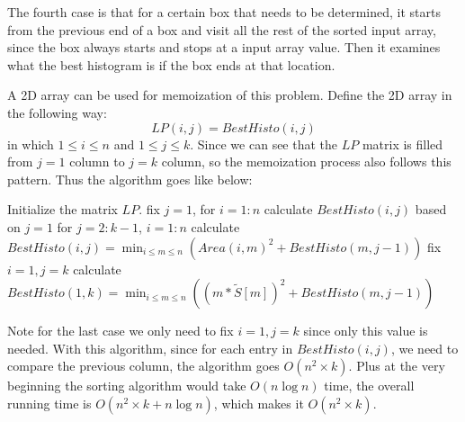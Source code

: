 \documentclass[11pt]{article}
\begin{document}
\begin{solution}[Problem 1]
\noindent The fourth case is that for a certain box that needs to be determined, it starts from the previous end of a box and visit all the rest of the sorted input array, since the box always starts and stops at a input array value. Then it examines what the best histogram is if the box ends at that location.

A 2D array can be used for memoization of this problem. Define the 2D array in the following way:
\[ LP(i,j)=BestHisto(i,j) \] 
in which $1\leq i \leq n$ and $1 \leq j \leq k$. Since we can see that the $LP$ matrix is filled from $j=1$ column to $j=k$ column, so the memoization process also follows this pattern.  Thus the algorithm goes like below:

Initialize the matrix $LP$.
\newline\indent fix $j=1$, for $i=1:n$
\newline\indent\indent calculate $BestHisto(i,j)$ based on $j=1$
\newline\indent for $j=2:k-1$, $i=1:n$
\newline\indent\indent calculate $BestHisto(i,j)=\min_{i\leq m\leq n} ({Area(i,m)}^2+ BestHisto(m,j-1))$
\newline\indent fix $i=1,j=k$
\newline\indent\indent calculate $BestHisto(1,k)=\min_{i\leq m\leq n} ({(m*\widetilde{S}[m])}^2+ BestHisto(m,j-1))$

\noindent Note for the last case we only need to fix $i=1,j=k$ since only this value is needed. With this algorithm, since for each entry in $BestHisto(i,j)$, we need to compare the previous column, the algorithm goes $O(n^2\times k)$. Plus at the very beginning the sorting algorithm would take $O(n\log{n})$ time, the overall running time is $O(n^2\times k+n\log{n})$, which makes it $O(n^2\times k)$.





\end{solution}
\end{document}
